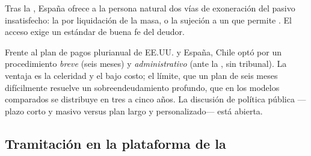 Tras la 
\parencite{esp-ley16-2022}, España ofrece a la persona natural dos vías de exoneración del pasivo
insatisfecho: la  por liquidación de la masa, o la sujeción a un
 que permite . El acceso exige un estándar de buena fe del deudor.

\begin{foco}
Frente al plan de pagos plurianual de EE.UU. y España, Chile optó por un procedimiento
\emph{breve} (seis meses) y \emph{administrativo} (ante la \superir{}, sin tribunal). La ventaja
es la celeridad y el bajo costo; el límite, que un plan de seis meses difícilmente resuelve un
sobreendeudamiento profundo, que en los modelos comparados se distribuye en tres a cinco años.
La discusión de política pública ---plazo corto y masivo versus plan largo y personalizado---
está abierta.
\end{foco}

\bloquePractico

\subsection{Tramitación en la plataforma de la \superir{}}

